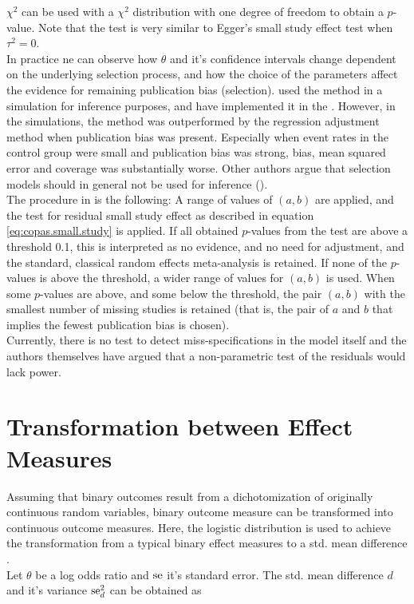 \documentclass[11pt,a4paper,twoside]{book}\usepackage[]{graphicx}\usepackage[]{color}
\begin{document}
$\chi^2$ can be used with a $\chi^2$ distribution with one degree of freedom to obtain a $p$\hspace{0.4mm}-value. Note that the test is very similar to Egger's small study effect test when $\tau^2 = 0$.\\
In practice ne can observe how $\theta$ and it's confidence intervals change dependent on the underlying selection process, and how the choice of the parameters affect the evidence for remaining publication bias (selection). \citet{limitmeta} used the method in a simulation for inference purposes, and have implemented it in the \citet{meta.package}. However, in the simulations, the method was outperformed by the regression adjustment method when publication bias was present. Especially when event rates in the control group were small and publication bias was strong, bias, mean squared error and coverage was substantially worse. Other authors argue that selection models should in general not be used for inference (\eg \citet{selection.assessment}).\\
The procedure in \citet{limitmeta} is the following: A range of values of $(a,b)$ are applied, and the test for residual small study effect as described in equation \eqref{eq:copas.small.study} is applied. If all obtained $p$\hspace{0.4mm}-values from the test are above a threshold 0.1, this is interpreted as no evidence, and no need for adjustment, and the standard, classical random effects meta-analysis is retained. If none of the $p$\hspace{0.4mm}-values is above the threshold, a wider range of values for $(a,b)$ is used. When some $p$\hspace{0.4mm}-values are above, and some below the threshold, the pair $(a,b)$ with the smallest number of missing studies is retained (that is, the pair of $a$ and $b$ that implies the fewest publication bias is chosen).\\
Currently, there is no test to detect miss-specifications in the model itself and the authors themselves have argued that a non-parametric test of the residuals would lack power.



\section{Transformation between Effect Measures} \label{sec:transformation.effectsizes}
Assuming that binary outcomes result from a dichotomization of originally continuous random variables, binary outcome measure can be transformed into continuous outcome measures. Here, the logistic distribution is used to achieve the transformation from a typical binary effect measures to a std. mean difference \cite[47]{Intro.meta}.\\
Let $\theta$ be a log odds ratio and $\operatorname{se}$ it's standard error. The std. mean difference $d$ and it's variance $\operatorname{se}_d^2$ can be obtained as
\end{document}
